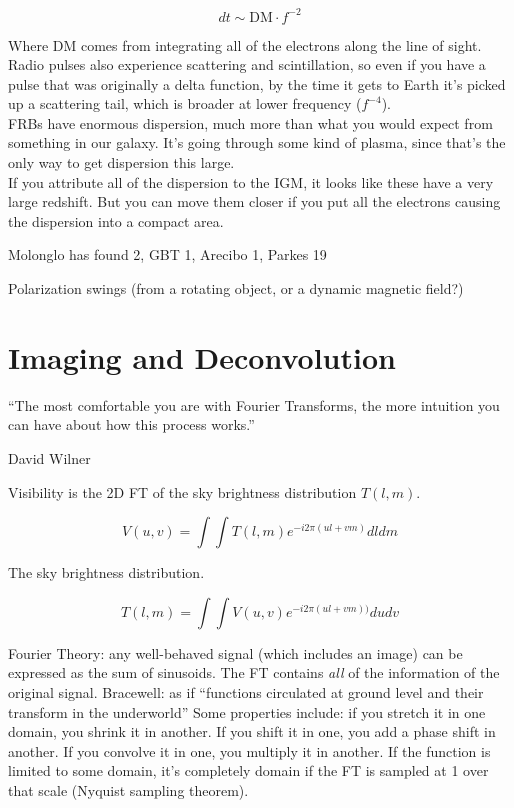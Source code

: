 \documentclass[a4paper]{article}
\begin{document}
$$ dt \sim \mathrm{DM} \cdot f^{-2} $$

Where DM comes from integrating all of the electrons along the line of sight. Radio pulses also experience scattering and scintillation, so even if you have a pulse that was originally a delta function, by the time it gets to Earth it's picked up a scattering tail, which is broader at lower frequency ($f^{-4}$). \\

FRBs have enormous dispersion, much more than what you would expect from something in our galaxy. It's going through some kind of plasma, since that's the only way to get dispersion this large. \\

If you attribute all of the dispersion to the IGM, it looks like these have a very large redshift. But you can move them closer if you put all the electrons causing the dispersion into a compact area.

Molonglo has found 2, GBT 1, Arecibo 1, Parkes 19

Polarization swings (from a rotating object, or a dynamic magnetic field?)

\section{Imaging and Deconvolution}

\epigraph{``The most comfortable you are with Fourier Transforms, the more intuition you can have about how this process works.''}{David Wilner}

Visibility is the 2D FT of the sky brightness distribution $T(l,m)$. 

\begin{equation}
V(u,v) = \int \int T(l,m) e^{-i 2 \pi (ul + vm)} dl dm
\end{equation}

The sky brightness distribution. 

\begin{equation}
T(l,m) = \int \int V(u,v) e^{-i 2 \pi (ul + vm))} du dv
\end{equation}

Fourier Theory: any well-behaved signal (which includes an image) can be expressed as the sum of sinusoids. The FT contains \emph{all} of the information of the original signal. Bracewell: as if ``functions circulated at ground level and their transform in the underworld'' Some properties include: if you stretch it in one domain, you shrink it in another. If you shift it in one, you add a phase shift in another. If you convolve it in one, you multiply it in another. If the function is limited to some domain, it's completely domain if the FT is sampled at 1 over that scale (Nyquist sampling theorem). \\
\end{document}
